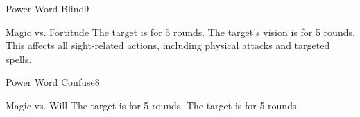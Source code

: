 \begin{spellsection}{Power Word Blind}{9}
    \begin{spellheader}
    \end{spellheader}
    \begin{spellcontent}
        \begin{spelltargetinginfo}
        \end{spelltargetinginfo}
        \begin{spelleffects}
            \begin{spellattack}{Magic vs. Fortitude}
                \spellsuccess The target is \blinded for 5 rounds.
                \spellfailure The target's vision is \impaired for 5 rounds. This affects all sight-related actions, including physical attacks and targeted spells.
            \end{spellattack}
        \end{spelleffects}
    \end{spellcontent}
    \begin{spellfooter}
        \miscastrandom
    \end{spellfooter}
\end{spellsection}

\begin{spellsection}{Power Word Confuse}{8}
    \begin{spellheader}
    \end{spellheader}
    \begin{spellcontent}
        \begin{spelltargetinginfo}
        \end{spelltargetinginfo}
        \begin{spelleffects}
            \begin{spellattack}{Magic vs. Will}
                \spellsuccess The target is \confused for 5 rounds.
                \spellfailure The target is \disoriented for 5 rounds.
            \end{spellattack}
        \end{spelleffects}
    \end{spellcontent}
    \begin{spellfooter}
        \miscastrandom
    \end{spellfooter}
\end{spellsection}

